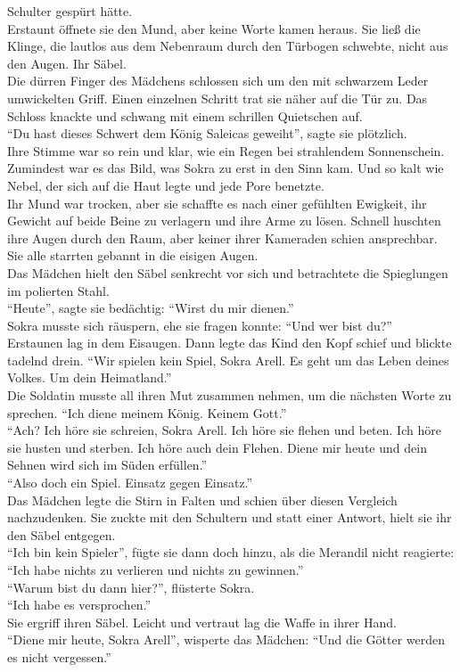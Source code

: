 Schulter gespürt hätte.\\
Erstaunt öffnete sie den Mund, aber keine Worte kamen heraus. Sie ließ die Klinge, die lautlos aus 
dem Nebenraum durch den Türbogen schwebte, nicht aus den Augen. Ihr Säbel.\\
Die dürren Finger des Mädchens schlossen sich um den mit schwarzem Leder umwickelten 
Griff. Einen einzelnen Schritt trat sie näher auf die Tür zu. Das Schloss knackte und schwang mit 
einem schrillen Quietschen auf.\\
``Du hast dieses Schwert dem König Saleicas geweiht'', sagte sie plötzlich.\\
Ihre Stimme war so rein und klar, wie ein Regen bei strahlendem Sonnenschein. Zumindest war es das 
Bild, was Sokra zu erst in den Sinn kam. Und so kalt wie Nebel, der sich auf die Haut legte und 
jede Pore benetzte.\\
Ihr Mund war trocken, aber sie schaffte es nach einer gefühlten Ewigkeit, ihr Gewicht auf beide 
Beine zu verlagern und ihre Arme zu lösen. Schnell huschten ihre Augen durch den Raum, aber keiner 
ihrer Kameraden schien ansprechbar. Sie alle starrten gebannt in die eisigen Augen.\\
Das Mädchen hielt den Säbel senkrecht vor sich und betrachtete die Spieglungen im polierten 
Stahl.\\
``Heute'', sagte sie bedächtig: ``Wirst du mir dienen.''\\
Sokra musste sich räuspern, ehe sie fragen konnte: ``Und wer bist du?''\\
Erstaunen lag in dem Eisaugen. Dann legte das Kind den Kopf schief und blickte tadelnd drein. ``Wir 
spielen kein Spiel, Sokra Arell. Es geht um das Leben deines Volkes. Um dein Heimatland.''\\
Die Soldatin musste all ihren Mut zusammen nehmen, um die nächsten Worte zu sprechen. ``Ich diene 
meinem König. Keinem Gott.''\\
``Ach? Ich höre sie schreien, Sokra Arell. Ich höre sie flehen und beten. Ich höre sie husten und 
sterben. Ich höre auch dein Flehen. Diene mir heute und dein Sehnen wird sich im Süden erfüllen.''\\
``Also doch ein Spiel. Einsatz gegen Einsatz.''\\
Das Mädchen legte die Stirn in Falten und schien über diesen Vergleich nachzudenken. Sie zuckte mit 
den Schultern und statt einer Antwort, hielt sie ihr den Säbel entgegen.\\
``Ich bin kein Spieler'', fügte sie dann doch hinzu, als die Merandil nicht reagierte: ``Ich habe 
nichts zu verlieren und nichts zu gewinnen.''\\
``Warum bist du dann hier?'', flüsterte Sokra.\\
``Ich habe es versprochen.''\\
Sie ergriff ihren Säbel. Leicht und vertraut lag die Waffe in ihrer Hand.\\
``Diene mir heute, Sokra Arell'', wisperte das Mädchen: ``Und die Götter werden es nicht 
vergessen.''

